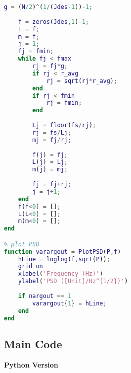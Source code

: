 \begin{lstlisting}[language=Matlab]
    g = (N/2)^(1/(Jdes-1))-1;
    
    f = zeros(Jdes,1)-1;
    L = f;
    m = f;
    j = 1;
    fj = fmin;
    while fj < fmax
        rj = fj*g;
        if rj < r_avg
            rj = sqrt(rj*r_avg);
        end
        if rj < fmin
            rj = fmin;
        end
        
        Lj = floor(fs/rj);
        rj = fs/Lj;
        mj = fj/rj;
        
        f(j) = fj;
        L(j) = Lj;
        m(j) = mj;
        
        fj = fj+rj;
        j = j+1;
    end
    f(f<0) = [];
    L(L<0) = [];
    m(m<0) = [];
end

% plot PSD
function varargout = PlotPSD(P,f)
    hLine = loglog(f,sqrt(P));
    grid on
    xlabel('Frequency (Hz)')
    ylabel('PSD ([Unit]/Hz^{1/2})')
    
    if nargout == 1
        varargout{1} = hLine;
    end
end
\end{lstlisting}





\subsection{Main Code}


{\noindent \bfseries Python Version}



